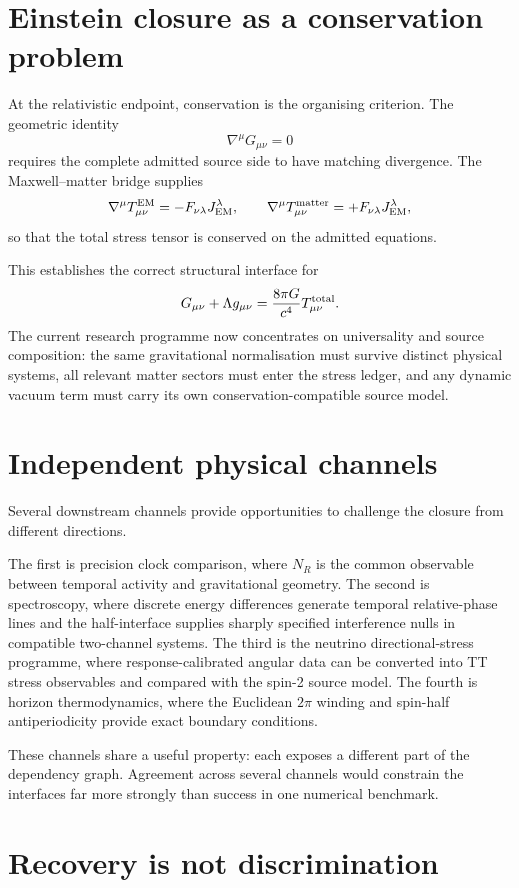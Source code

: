 \documentclass[11pt]{book}
\begin{document}
\section{Einstein closure as a conservation problem}

At the relativistic endpoint, conservation is the organising criterion. The geometric identity
\[
\nabla^\mu G_{\mu\nu}=0
\]
requires the complete admitted source side to have matching divergence. The Maxwell--matter bridge supplies
\[
\nabla^\mu T^{\rm EM}_{\mu\nu}
=-F_{\nu\lambda}J_{\rm EM}^{\lambda},
\qquad
\nabla^\mu T^{\rm matter}_{\mu\nu}
=+F_{\nu\lambda}J_{\rm EM}^{\lambda},
\]
so that the total stress tensor is conserved on the admitted equations.

This establishes the correct structural interface for
\[
G_{\mu\nu}+\Lambda g_{\mu\nu}
=
\frac{8\pi G}{c^4}T^{\rm total}_{\mu\nu}.
\]
The current research programme now concentrates on universality and source composition: the same gravitational normalisation must survive distinct physical systems, all relevant matter sectors must enter the stress ledger, and any dynamic vacuum term must carry its own conservation-compatible source model.

\section{Independent physical channels}

Several downstream channels provide opportunities to challenge the closure from different directions.

The first is precision clock comparison, where \(N_R\) is the common observable between temporal activity and gravitational geometry. The second is spectroscopy, where discrete energy differences generate temporal relative-phase lines and the half-interface supplies sharply specified interference nulls in compatible two-channel systems. The third is the neutrino directional-stress programme, where response-calibrated angular data can be converted into TT stress observables and compared with the spin-2 source model. The fourth is horizon thermodynamics, where the Euclidean \(2\pi\) winding and spin-half antiperiodicity provide exact boundary conditions.

These channels share a useful property: each exposes a different part of the dependency graph. Agreement across several channels would constrain the interfaces far more strongly than success in one numerical benchmark.

\section{Recovery is not discrimination}
\end{document}
